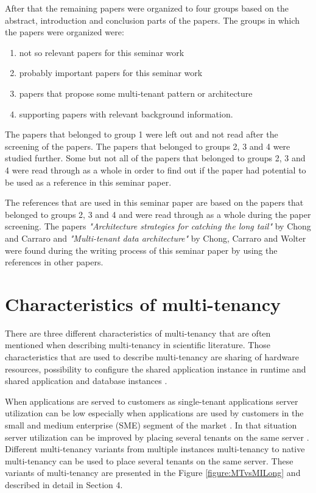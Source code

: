 \documentclass[conference]{sasmoota2017}
\begin{document}
After that the remaining papers were organized to four groups based on the abstract, introduction and conclusion parts of the papers. The groups in which the papers were organized were: 
\begin{enumerate}
\item not so relevant papers for this seminar work
\item probably important papers for this seminar work
\item papers that propose some multi-tenant pattern or architecture
\item supporting papers with relevant background information.
\end{enumerate}
The papers that belonged to group 1 were left out and not read after the screening of the papers. The papers that belonged to groups 2, 3 and 4 were studied further. Some but not all of the papers that belonged to groups 2, 3 and 4 were read through as a whole in order to find out if the paper had potential to be used as a reference in this seminar paper. 

The references that are used in this seminar paper are based on the papers that belonged to groups 2, 3 and 4 and were read through as a whole during the paper screening. The papers \textit{"Architecture strategies for catching the long tail"} by Chong and Carraro \cite{Carraro:2006:ArchitectureLongTail} and \textit{"Multi-tenant data architecture"} by Chong, Carraro and Wolter \cite{Chong:2006:MultiTenantDataArchitecture} were found during the writing process of this seminar paper by using the references in other papers.  


\section{Characteristics of multi-tenancy}

There are three different characteristics of multi-tenancy that are often mentioned when describing multi-tenancy in scientific literature. Those characteristics that are used to describe multi-tenancy are sharing of hardware resources, possibility to configure the shared application instance in runtime and shared application and database instances \cite{Bezemer:2010:MaintenanceDream}. 

When applications are served to customers as single-tenant applications server utilization can be low especially when applications are used by customers in the small and medium enterprise (SME) segment of the market \cite{Bezemer:2010:MaintenanceDream}. In that situation server utilization can be improved by placing several tenants on the same server \cite{Bezemer:2010:MaintenanceDream}. Different multi-tenancy variants from multiple instances multi-tenancy to native multi-tenancy can be used to place several tenants on the same server. These variants of multi-tenancy are presented in the Figure \ref{figure:MTvsMILong} and described in detail in Section 4.
\end{document}

